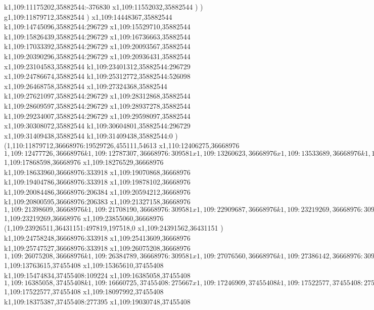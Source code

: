 {k1,109:11175202,35882544:-376830
x1,109:11552032,35882544
)
)
g1,109:11879712,35882544
)
x1,109:14448367,35882544
k1,109:14745096,35882544:296729
x1,109:15529710,35882544
k1,109:15826439,35882544:296729
x1,109:16736663,35882544
k1,109:17033392,35882544:296729
x1,109:20093567,35882544
k1,109:20390296,35882544:296729
x1,109:20936431,35882544
x1,109:23104583,35882544
k1,109:23401312,35882544:296729
x1,109:24786674,35882544
k1,109:25312772,35882544:526098
x1,109:26468758,35882544
x1,109:27324368,35882544
k1,109:27621097,35882544:296729
x1,109:28312868,35882544
k1,109:28609597,35882544:296729
x1,109:28937278,35882544
k1,109:29234007,35882544:296729
x1,109:29598097,35882544
x1,109:30308072,35882544
k1,109:30604801,35882544:296729
x1,109:31409438,35882544
k1,109:31409438,35882544:0
)
(1,110:11879712,36668976:19529726,455111,54613
x1,110:12406275,36668976
$1,109:12477726,36668976
k1,109:12787307,36668976:309581
x1,109:13260623,36668976
x1,109:13533689,36668976
k1,109:13843271,36668976:309582
x1,109:14862722,36668976
k1,109:15172303,36668976:309581
x1,109:15864074,36668976
x1,109:16191755,36668976
x1,109:16464821,36668976
k1,109:16774403,36668976:309582
x1,109:17559017,36668976
k1,109:17868598,36668976:309581
$1,109:17868598,36668976
x1,109:18276529,36668976
k1,109:18633960,36668976:333918
x1,109:19070868,36668976
k1,109:19404786,36668976:333918
x1,109:19878102,36668976
k1,109:20084486,36668976:206384
x1,109:20594212,36668976
k1,109:20800595,36668976:206383
x1,109:21327158,36668976
$1,109:21398609,36668976
k1,109:21708190,36668976:309581
x1,109:22909687,36668976
k1,109:23219269,36668976:309582
$1,109:23219269,36668976
x1,109:23855060,36668976
(1,109:23926511,36431151:497819,197518,0
x1,109:24391562,36431151
)
k1,109:24758248,36668976:333918
x1,109:25413609,36668976
k1,109:25747527,36668976:333918
x1,109:26075208,36668976
$1,109:26075208,36668976
k1,109:26384789,36668976:309581
x1,109:27076560,36668976
k1,109:27386142,36668976:309582
x1,109:28296365,36668976
x1,109:28642250,36668976
k1,109:28951831,36668976:309581
x1,109:29315921,36668976
x1,109:31409438,36668976
k1,109:31409438,36668976:0
)
(1,110:11879712,37455408:19529726,491520,163840
x1,110:12684349,37455408
k1,109:12960016,37455408:275667
x1,109:13487947,37455408
k1,109:13763615,37455408:275668
$1,109:13763615,37455408
x1,109:15365610,37455408
k1,109:15474834,37455408:109224
x1,109:16385058,37455408
$1,109:16385058,37455408
k1,109:16660725,37455408:275667
x1,109:17246909,37455408
k1,109:17522577,37455408:275668
$1,109:17522577,37455408
x1,109:18097992,37455408
k1,109:18375387,37455408:277395
x1,109:19030748,37455408
}
